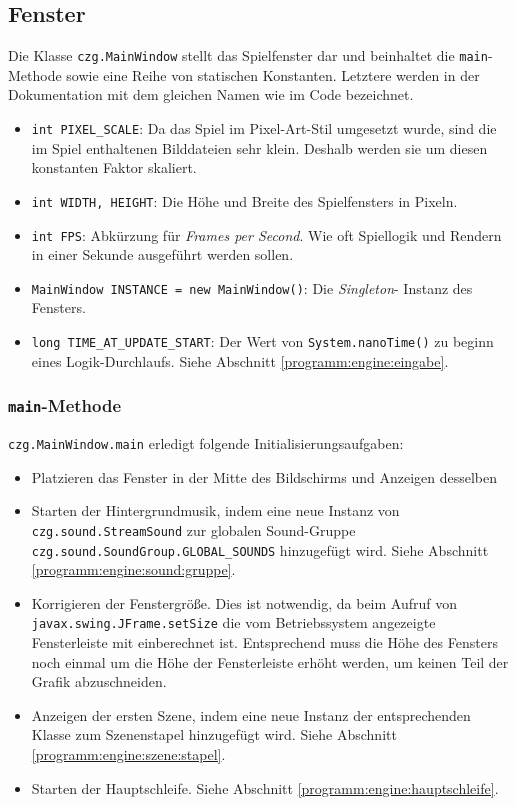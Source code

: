 \begin{sloppypar}

\subsection{Fenster}

Die Klasse \texttt{czg.MainWindow} stellt das Spielfenster
dar und beinhaltet die \texttt{main}-Methode sowie eine
Reihe von statischen Konstanten. Letztere werden in der
Dokumentation mit dem gleichen Namen wie im Code bezeichnet.

\begin{itemize}
	\item \texttt{int PIXEL\_SCALE}: Da das Spiel im Pixel-Art-Stil
	      umgesetzt wurde, sind die im Spiel enthaltenen Bilddateien sehr
	      klein. Deshalb werden sie um diesen konstanten Faktor skaliert.
	\item \texttt{int WIDTH, HEIGHT}: Die Höhe und Breite des Spielfensters
	      in Pixeln.
	\item \texttt{int FPS}: Abkürzung für \textit{Frames per Second}.
	      Wie oft Spiellogik und Rendern in einer Sekunde ausgeführt
	      werden sollen.
	\item \texttt{MainWindow INSTANCE = new MainWindow()}: Die \textit{Singleton}-
	      Instanz des Fensters.
	\item \texttt{long TIME\_AT\_UPDATE\_START}: Der Wert von \texttt{System.nanoTime()}
	      zu beginn eines Logik-Durchlaufs. Siehe Abschnitt \ref{programm:engine:eingabe}.
\end{itemize}


\subsubsection{\texttt{main}-Methode}

\texttt{czg.MainWindow.main} erledigt folgende Initialisierungsaufgaben:

\begin{itemize}
	\item Platzieren das Fenster in der Mitte des Bildschirms und
	      Anzeigen desselben
	\item Starten der Hintergrundmusik, indem eine neue Instanz von
	      \texttt{czg.sound.StreamSound} zur globalen Sound-Gruppe
	      \texttt{czg.sound.SoundGroup.GLOBAL\_SOUNDS} hinzugefügt wird.
	      Siehe Abschnitt \ref{programm:engine:sound:gruppe}.
	\item Korrigieren der Fenstergröße. Dies ist notwendig, da beim
	      Aufruf von \texttt{javax.swing.JFrame.setSize} die vom
	      Betriebssystem angezeigte Fensterleiste mit einberechnet
	      ist. Entsprechend muss die Höhe des Fensters noch einmal
	      um die Höhe der Fensterleiste erhöht werden, um keinen Teil
	      der Grafik abzuschneiden.
	\item Anzeigen der ersten Szene, indem eine neue Instanz der entsprechenden
	      Klasse zum Szenenstapel hinzugefügt wird. Siehe Abschnitt \ref{programm:engine:szene:stapel}.
	\item Starten der Hauptschleife. Siehe Abschnitt \ref{programm:engine:hauptschleife}.
\end{itemize}



\end{sloppypar}
